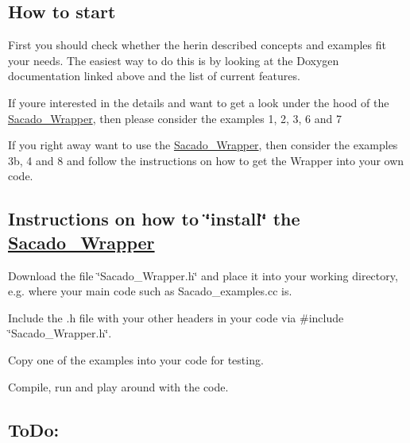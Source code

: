 \subsection*{How to start}


\begin{DoxyItemize}
\item First you should check whether the herin described concepts and examples fit your needs. The easiest way to do this is by looking at the Doxygen documentation linked above and the list of current features.
\item If you\textquotesingle{}re interested in the details and want to get a look under the hood of the \hyperlink{namespaceSacado__Wrapper}{Sacado\+\_\+\+Wrapper}, then please consider the examples 1, 2, 3, 6 and 7
\item If you right away want to use the \hyperlink{namespaceSacado__Wrapper}{Sacado\+\_\+\+Wrapper}, then consider the examples 3b, 4 and 8 and follow the instructions on how to get the Wrapper into your own code.
\end{DoxyItemize}

\subsection*{Instructions on how to \char`\"{}install\char`\"{} the \hyperlink{namespaceSacado__Wrapper}{Sacado\+\_\+\+Wrapper}}


\begin{DoxyEnumerate}
\item Download the file \char`\"{}\+Sacado\+\_\+\+Wrapper.\+h\char`\"{} and place it into your working directory, e.\+g. where your main code such as Sacado\+\_\+examples.\+cc is.
\item Include the .h file with your other headers in your code via \textquotesingle{}\#include \char`\"{}\+Sacado\+\_\+\+Wrapper.\+h\char`\"{}\textquotesingle{}.
\item Copy one of the examples into your code for testing.
\item Compile, run and play around with the code.
\end{DoxyEnumerate}

\subsection*{To\+Do\+:}


